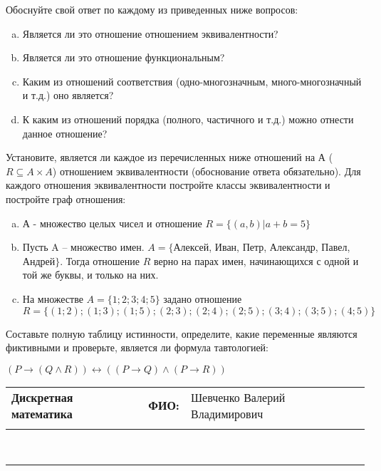 \documentclass[10pt]{exam}
\newcommand{\class}{Дискретная математика}
\newcommand{\examdate}{}
\begin{document}
\begin{questions}
Обоснуйте свой ответ по каждому из приведенных ниже вопросов:
\begin{enumerate} [a)]\setcounter{enumi}{0}
    \item Является ли это отношение отношением эквивалентности?
    \item Является ли это отношение функциональным?
    \item Каким из отношений соответствия (одно-многозначным, много-многозначный и т.д.) оно является?
    \item К каким из отношений порядка (полного, частичного и т.д.) можно отнести данное отношение?
\end{enumerate}
\question
Установите, является ли каждое из перечисленных ниже отношений на А ($R \subseteq A \times A$) отношением эквивалентности (обоснование ответа обязательно). Для каждого отношения эквивалентности постройте классы 
эквивалентности и постройте граф отношения:
\begin{enumerate} [a)]\setcounter{enumi}{0}
\item А - множество целых чисел и отношение $R = \{(a,b)|a + b = 5\}$
\item Пусть A – множество имен. $A = \{ $Алексей, Иван, Петр, Александр, Павел, Андрей$ \}$. Тогда отношение $R $ верно на парах имен, начинающихся с одной и той же буквы, и только на них.
\item На множестве $A = \{1; 2; 3; 4; 5\}$ задано отношение $R = \{(1; 2); (1; 3); (1; 5); (2; 3); (2; 4); (2; 5); (3; 4); (3; 5); (4; 5)\}$
\end{enumerate}\question Составьте полную таблицу истинности, определите, какие переменные являются фиктивными и проверьте, является ли формула тавтологией:

$(P \rightarrow (Q \land R)) \leftrightarrow ((P \rightarrow Q) \land (P \rightarrow R))$

\end{questions}
\newpage
\begin{flushright}
\begin{tabular}{p{2.8in} r l}
\textbf{\class} & \textbf{ФИО:} &Шевченко Валерий Владимирович
\\

\textbf{\examdate} &&\\
\end{tabular}\\
\end{flushright}
\rule[1ex]{\textwidth}{.1pt}
\end{document}
